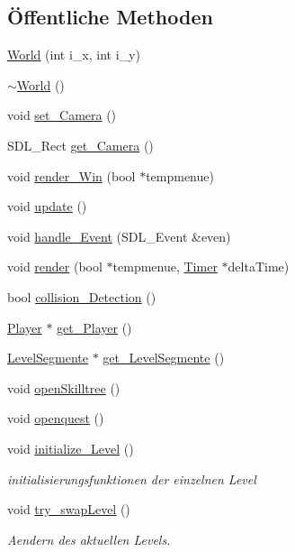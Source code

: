 \subsection*{Öffentliche Methoden}
\begin{DoxyCompactItemize}
\item 
\hyperlink{class_world_a223764f33284a2f1f0bf647ffb210759}{World} (int i\-\_\-x, int i\-\_\-y)
\item 
\hyperlink{class_world_a8c73fba541a5817fff65147ba47cd827}{$\sim$\-World} ()
\item 
void \hyperlink{class_world_a149a22406179d656aea426c32577bed9}{set\-\_\-\-Camera} ()
\item 
S\-D\-L\-\_\-\-Rect \hyperlink{class_world_ae55ead4b6828a5f2b3a6d93e8c947c97}{get\-\_\-\-Camera} ()
\item 
void \hyperlink{class_world_a9164eb25c327d3c1153deb6a6fd89a83}{render\-\_\-\-Win} (bool $\ast$tempmenue)
\item 
void \hyperlink{class_world_aac8c1fde63c06577ffc648aaefdb37f0}{update} ()
\item 
void \hyperlink{class_world_a6e9d1717aae39babd17d801a7de6486d}{handle\-\_\-\-Event} (S\-D\-L\-\_\-\-Event \&even)
\item 
void \hyperlink{class_world_a15a2d4bb5a4f26400a6c1365d8eb4875}{render} (bool $\ast$tempmenue, \hyperlink{class_timer}{Timer} $\ast$delta\-Time)
\item 
bool \hyperlink{class_world_ae324f881eae678d166eb81321dc8cbab}{collision\-\_\-\-Detection} ()
\item 
\hyperlink{class_player}{Player} $\ast$ \hyperlink{class_world_af0d1ca602664a0a005cf1521b6aee784}{get\-\_\-\-Player} ()
\item 
\hyperlink{class_level_segmente}{Level\-Segmente} $\ast$ \hyperlink{class_world_affdfa76f27683180d8103b297ae6972c}{get\-\_\-\-Level\-Segmente} ()
\item 
void \hyperlink{class_world_aae955513a6b43da75bebbaf0022efcc3}{open\-Skilltree} ()
\item 
void \hyperlink{class_world_a503eb92ca22d62edfba5caaa405b7ff7}{openquest} ()
\item 
void \hyperlink{class_world_a862716ca9282cf7f64522fd819427498}{initialize\-\_\-\-Level} ()
\begin{DoxyCompactList}\small\item\em initialisierungsfunktionen der einzelnen Level \end{DoxyCompactList}\item 
void \hyperlink{class_world_a227f2998664ae3586190752920ee2713}{try\-\_\-swap\-Level} ()
\begin{DoxyCompactList}\small\item\em Aendern des aktuellen Levels. \end{DoxyCompactList}\end{DoxyCompactItemize}


